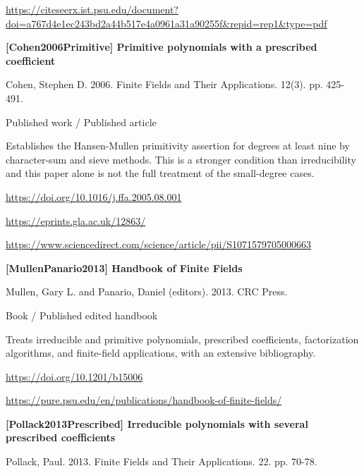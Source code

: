 \documentclass[11pt,a4paper,oneside,openany]{book}
\begin{document}
{\footnotesize\url{https://citeseerx.ist.psu.edu/document?doi=a767d4e1ec243bd2a44b517e4a0961a31a90255f&repid=rep1&type=pdf}}\par
\vspace{9pt}
\hypertarget{ref:Cohen2006Primitive}{}
{\sffamily\bfseries\color{atlasgreen}[Cohen2006Primitive] Primitive polynomials with a prescribed coefficient}\par
\color{black} Cohen, Stephen D. 2006. Finite Fields and Their Applications. 12(3). pp. 425-491.\par
{\small\sffamily\color{atlasgold}Published work / Published article}\par
\color{black} Establishes the Hansen-Mullen primitivity assertion for degrees at least nine by character-sum and sieve methods. This is a stronger condition than irreducibility and this paper alone is not the full treatment of the small-degree cases.\par
{\footnotesize\url{https://doi.org/10.1016/j.ffa.2005.08.001}}\par
{\footnotesize\url{https://eprints.gla.ac.uk/12863/}}\par
{\footnotesize\url{https://www.sciencedirect.com/science/article/pii/S1071579705000663}}\par
\vspace{9pt}
\hypertarget{ref:MullenPanario2013}{}
{\sffamily\bfseries\color{atlasgreen}[MullenPanario2013] Handbook of Finite Fields}\par
\color{black} Mullen, Gary L. and Panario, Daniel (editors). 2013. CRC Press.\par
{\small\sffamily\color{atlasgold}Book / Published edited handbook}\par
\color{black} Treats irreducible and primitive polynomials, prescribed coefficients, factorization algorithms, and finite-field applications, with an extensive bibliography.\par
{\footnotesize\url{https://doi.org/10.1201/b15006}}\par
{\footnotesize\url{https://pure.psu.edu/en/publications/handbook-of-finite-fields/}}\par
\vspace{9pt}
\hypertarget{ref:Pollack2013Prescribed}{}
{\sffamily\bfseries\color{atlasgreen}[Pollack2013Prescribed] Irreducible polynomials with several prescribed coefficients}\par
\color{black} Pollack, Paul. 2013. Finite Fields and Their Applications. 22. pp. 70-78.\par
\end{document}
